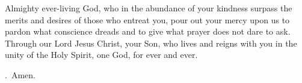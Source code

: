 \lettrine[lines=3]{A}{}lmighty ever-living God, who in the abundance of your kindness surpass the merits and desires of those who entreat you, pour out your mercy upon us to pardon what conscience dreads and to give what prayer does not dare to ask. Through our Lord Jesus Christ, your Son, who lives and reigns with you in the unity of the Holy Spirit, one God, for ever and ever. \par \Rbar.~Amen.

